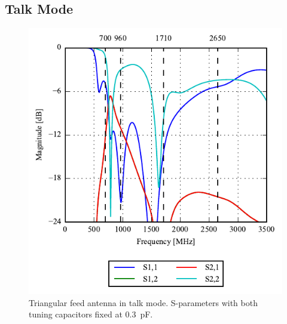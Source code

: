 \subsection{Talk Mode}

\begin{figure}[htbp]
    \centering
    \includegraphics{img/tech_sol/trianglefeed/talk_mode/sparams.pdf}
    \caption{Triangular feed antenna in talk mode. S-parameters with both tuning capacitors fixed at \SI{0.3}{pF}.}
    \label{fig:triang_sparam_talk}
\end{figure}

